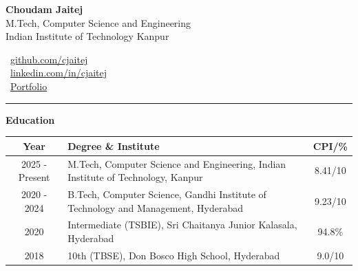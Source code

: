 \documentclass[10pt]{extarticle}
\newcommand{\sectionheader}[1]{
    \vspace{3pt}
    \begin{tcolorbox}
        \textbf{\large #1}
    \end{tcolorbox}
    \vspace{2pt}
}
\begin{document}
\pagestyle{empty}

\noindent
\begin{minipage}[t]{0.7\textwidth}
{\fontsize{20}{24}\selectfont\textbf{Choudam Jaitej}}\\[2pt]
\small M.Tech, Computer Science and Engineering\\[1pt]
\small Indian Institute of Technology Kanpur
\end{minipage}%
\begin{minipage}[t]{0.3\textwidth}
\raggedleft
\small \faGithub\ \href{https://github.com/cjaitej}{github.com/cjaitej}\\[2pt]
\small \faLinkedin\ \href{https://www.linkedin.com/in/cjaitej/}{linkedin.com/in/cjaitej}\\[2pt]
\small \faGlobe\ \href{http://localhost:5173/}{Portfolio}
\end{minipage}
\vspace{2pt}

\noindent\rule{\linewidth}{0.7pt}
\vspace{3pt}

\sectionheader{Education}
\setlength{\tabcolsep}{5pt}
\renewcommand{\arraystretch}{1.25}
\noindent
\begin{tabularx}{\textwidth}{|c|>{\raggedright\arraybackslash}X|c|}
\hline
\textbf{Year} & \textbf{Degree \& Institute} & \textbf{CPI/\%} \\
\hline
2025 - Present & M.Tech, Computer Science and Engineering, Indian Institute of Technology, Kanpur & 8.41/10 \\
\hline
2020 - 2024 & B.Tech, Computer Science, Gandhi Institute of Technology and Management, Hyderabad & 9.23/10 \\
\hline
2020 & Intermediate (TSBIE), Sri Chaitanya Junior Kalasala, Hyderabad & 94.8\% \\
\hline
2018 & 10th (TBSE), Don Bosco High School, Hyderabad & 9.0/10 \\
\hline
\end{tabularx}
\end{document}
